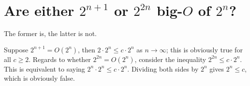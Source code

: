 \section[Problem 4]{Are either $2^{n + 1}$ or $2^{2n}$ big-$O$ of $2^n$?}

The former is, the latter is not. 

Suppose $2^{n + 1} = O(2^n)$, then $2 \cdot 2^n \leq c \cdot 2^n$ as $n \rightarrow \infty$; this is obviously true for all $c \geq 2$.  Regards to whether $2^{2n} = O(2^n)$, consider the inequality $2^{2n} \leq c \cdot 2^n$. This is equivalent to saying $2^n \cdot 2^n \leq c \cdot 2^n$. Dividing both sides by $2^n$ gives $2^n \leq c$, which is obviously false.
